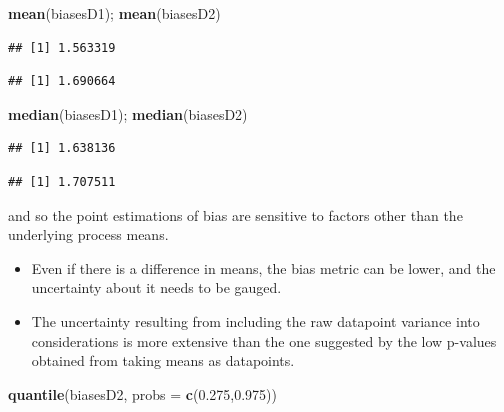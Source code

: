 \documentclass[10pt,dvipsnames,enabledeprecatedfontcommands]{scrartcl}
\newenvironment{Shaded}{\begin{snugshade}}{\end{snugshade}}
\newcommand{\KeywordTok}[1]{\textcolor[rgb]{0.13,0.29,0.53}{\textbf{#1}}}
\newcommand{\DataTypeTok}[1]{\textcolor[rgb]{0.13,0.29,0.53}{#1}}
\newcommand{\FloatTok}[1]{\textcolor[rgb]{0.00,0.00,0.81}{#1}}
\newcommand{\NormalTok}[1]{#1}
\begin{document}
\vspace{1mm} \footnotesize

\begin{Shaded}
\begin{Highlighting}[]
\KeywordTok{mean}\NormalTok{(biasesD1); }\KeywordTok{mean}\NormalTok{(biasesD2)}
\end{Highlighting}
\end{Shaded}

\begin{verbatim}
## [1] 1.563319
\end{verbatim}

\begin{verbatim}
## [1] 1.690664
\end{verbatim}

\begin{Shaded}
\begin{Highlighting}[]
\KeywordTok{median}\NormalTok{(biasesD1); }\KeywordTok{median}\NormalTok{(biasesD2)}
\end{Highlighting}
\end{Shaded}

\begin{verbatim}
## [1] 1.638136
\end{verbatim}

\begin{verbatim}
## [1] 1.707511
\end{verbatim}

\normalsize
and so the point estimations of bias are sensitive to factors other than
the underlying process means.

\begin{itemize}
\item
  Even if there is a difference in means, the bias metric can be lower,
  and the uncertainty about it needs to be gauged.
\item
  The uncertainty resulting from including the raw datapoint variance
  into considerations is more extensive than the one suggested by the
  low p-values obtained from taking means as datapoints.
\end{itemize}

\vspace{1mm} \footnotesize

\begin{Shaded}
\begin{Highlighting}[]
\KeywordTok{quantile}\NormalTok{(biasesD2, }\DataTypeTok{probs =} \KeywordTok{c}\NormalTok{(}\FloatTok{0.275}\NormalTok{,}\FloatTok{0.975}\NormalTok{))}
\end{Highlighting}
\end{Shaded}
\end{document}
